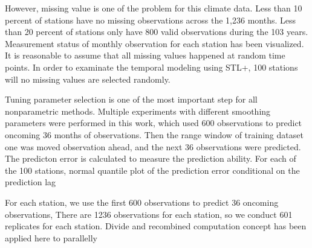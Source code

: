 However, missing value is one of the problem for this climate data. Less than 10 percent of stations
have no missing observations across the 1,236 months. Less than 20 percent of stations only have 800
valid observations during the 103 years. Measurement status of monthly observation for each station
has been visualized. It is reasonable to assume that all missing values happened at random time 
points. In order to examinate the temporal modeling using STL+, 100 stations will no missing values 
are selected randomly. 

Tuning parameter selection is one of the most important step for all nonparametric methods. Multiple 
experiments with different smoothing parameters were performed in this work, which used 600 
observations to predict oncoming 36 months of observations. Then the range window of training 
dataset one was moved observation ahead, and the next 36 observations were predicted. The predicton 
error is calculated to measure the prediction ability. For each of the 100 stations, normal quantile
plot of the prediction error conditional on the prediction lag 

For each station, we use the first 600 
observations to predict 36 oncoming observations,  There are 1236 observations for each 
station, so we conduct 601 replicates for each station. Divide and recombined computation concept 
has been applied here to parallelly 
